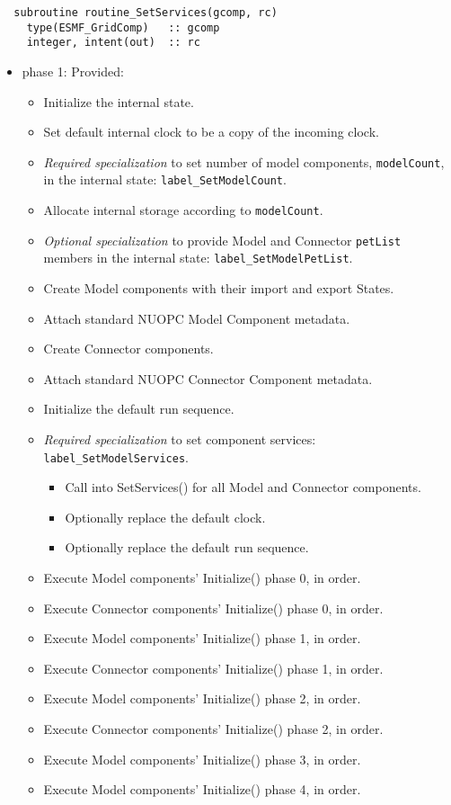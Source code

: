 \begin{verbatim}  subroutine routine_SetServices(gcomp, rc)
    type(ESMF_GridComp)   :: gcomp
    integer, intent(out)  :: rc
\end{verbatim}

\begin{itemize}
\item phase 1: {\sc Provided:}
  \begin{itemize}
  \item Initialize the internal state.
  \item Set default internal clock to be a copy of the incoming clock.
  \item {\it Required specialization} to set number of model components, {\tt modelCount}, in the internal state: {\tt label\_SetModelCount}.
  \item Allocate internal storage according to {\tt modelCount}.
  \item {\it Optional specialization} to provide Model and Connector {\tt petList} members in the internal state: {\tt label\_SetModelPetList}.
  \item Create Model components with their import and export States.
  \item Attach standard NUOPC Model Component metadata.
  \item Create Connector components.
  \item Attach standard NUOPC Connector Component metadata.
  \item Initialize the default run sequence.
  \item {\it Required specialization} to set component services: {\tt label\_SetModelServices}. 
  \begin{itemize}
    \item Call into SetServices() for all Model and Connector components.
    \item Optionally replace the default clock. 
    \item Optionally replace the default run sequence.
  \end{itemize}
  \item Execute Model components' Initialize() phase 0, in order.
  \item Execute Connector components' Initialize() phase 0, in order.
  \item Execute Model components' Initialize() phase 1, in order.
  \item Execute Connector components' Initialize() phase 1, in order.
  \item Execute Model components' Initialize() phase 2, in order.
  \item Execute Connector components' Initialize() phase 2, in order.
  \item Execute Model components' Initialize() phase 3, in order.
  \item Execute Model components' Initialize() phase 4, in order.
  \end{itemize}  
\end{itemize}

